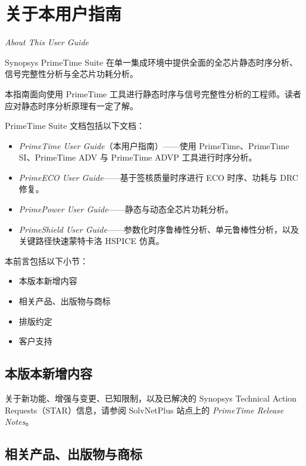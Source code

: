 \chapter*{关于本用户指南}

\noindent\textit{About This User Guide}

Synopsys PrimeTime Suite 在单一集成环境中提供全面的全芯片静态时序分析、信号完整性分析与全芯片功耗分析。

本指南面向使用 PrimeTime 工具进行静态时序与信号完整性分析的工程师。读者应对静态时序分析原理有一定了解。

PrimeTime Suite 文档包括以下文档：
\begin{itemize}
  \item \textit{PrimeTime User Guide}（本用户指南）——使用 PrimeTime、PrimeTime SI、PrimeTime ADV 与 PrimeTime ADVP 工具进行时序分析。
  \item \textit{PrimeECO User Guide}——基于签核质量时序进行 ECO 时序、功耗与 DRC 修复。
  \item \textit{PrimePower User Guide}——静态与动态全芯片功耗分析。
  \item \textit{PrimeShield User Guide}——参数化时序鲁棒性分析、单元鲁棒性分析，以及关键路径快速蒙特卡洛 HSPICE 仿真。
\end{itemize}

本前言包括以下小节：
\begin{itemize}
  \item 本版本新增内容
  \item 相关产品、出版物与商标
  \item 排版约定
  \item 客户支持
\end{itemize}

\section*{本版本新增内容}

关于新功能、增强与变更、已知限制，以及已解决的 Synopsys Technical Action Requests（STAR）信息，请参阅 SolvNetPlus 站点上的
\textit{PrimeTime Release Notes}。

\section*{相关产品、出版物与商标}

